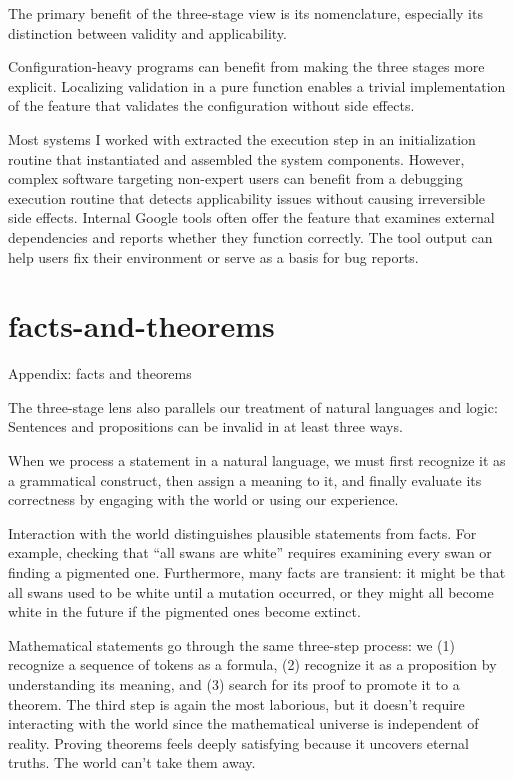 \documentclass{article}
\begin{document}
The primary benefit of the three-stage view is its nomenclature,
especially its distinction between validity and applicability.

Configuration-heavy programs can benefit from making the three stages more explicit.
Localizing validation in a pure function enables a trivial implementation of the  feature
that validates the configuration without side effects.

Most systems I worked with extracted the execution step in an initialization routine
that instantiated and assembled the system components.
However, complex software targeting non-expert users can benefit from a debugging execution routine
that detects applicability issues without causing irreversible side effects.
Internal Google tools often offer the  feature
that examines external dependencies and reports whether they function correctly.
The tool output can help users fix their environment or serve as a basis for bug reports.

\section{facts-and-theorems}{Appendix: facts and theorems}

The three-stage lens also parallels our treatment of natural languages and logic:
Sentences and propositions can be invalid in at least three ways.

When we process a statement in a natural language,
we must first recognize it as a grammatical construct,
then assign a meaning to it,
and finally evaluate its correctness by engaging with the world or using our experience.

Interaction with the world distinguishes plausible statements from facts.
For example, checking that ``all swans are white'' requires examining every swan or finding a pigmented one.
Furthermore, many facts are transient: it might be that all swans used to be white until a mutation occurred,
or they might all become white in the future if the pigmented ones become extinct.

Mathematical statements go through the same three-step process:
we (1) recognize a sequence of tokens as a formula,
(2) recognize it as a proposition by understanding its meaning,
and (3) search for its proof to promote it to a theorem.
The third step is again the most laborious, but it doesn't require interacting with the world since the mathematical universe is independent of reality.
Proving theorems feels deeply satisfying because it uncovers eternal truths.
The world can't take them away.
\end{document}
